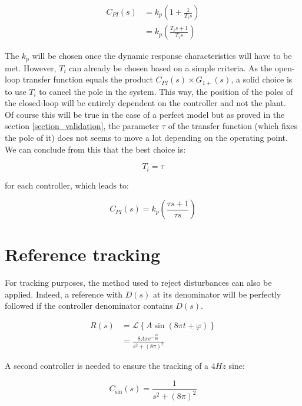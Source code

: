 \begin{align}
    C_{PI}(s) &= k_p \left( 1 + \frac{1}{T_i s} \right)\\
    &= k_p \left(\frac{T_i s + 1}{T_i s} \right)
    \label{eq:general_PI}
\end{align}

The $k_p$ will be chosen once the dynamic response characteristics will have to be met. However, $T_i$ can already be 
chosen based on a simple criteria. As the open-loop transfer function equals the product $C_{PI}(s) \times G_{1+} (s)$, a
solid choice is to use $T_i$ to cancel the pole in the system. This way, the position of the poles of the closed-loop
will be entirely dependent on the controller and not the plant.\\
Of course this will be true in the case of a perfect model but as proved in the section \ref{section_validation}, the
parameter $\tau$ of the transfer function (which fixes the pole of it) does not seems to move a lot depending on the 
operating point. We can conclude from this that the best choice is:

\begin{equation}
    T_i = \tau
\end{equation}

for each controller, which leads to:

\begin{equation}
    C_{PI}(s) = k_p \left( \frac{\tau s + 1}{\tau s} \right) 
    \label{eq:controller_PI}
\end{equation}


\iffalse
\section{Reference tracking}

For tracking purposes, the method used to reject disturbances can also be applied. Indeed, a reference with $D(s)$ at
its denominator will be perfectly followed if the controller denominator contains $D(s)$.

\begin{align}
    R(s) &= \mathcal{L}\left\{A \sin (8 \pi t + \varphi)\right\} \\
    &= \frac{8 A \pi e^{-\frac{\varphi s}{8 \pi}}}{s^2 + (8\pi)^2}
\end{align}

A second controller is needed to ensure the tracking of a $4 Hz$ sine:

\begin{equation}
    C_{\sin}(s) = \frac{1}{s^2 + (8\pi)^2}
    \label{eq:controller_sin}
\end{equation}

